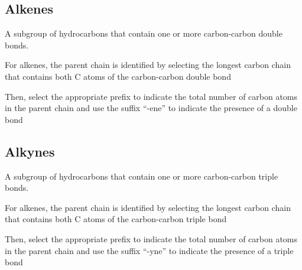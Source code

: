\subsection{Alkenes}
A subgroup of hydrocarbons that contain one or more carbon-carbon double bonds.
\begin{enum}
    \item For alkenes, the parent chain is identified by selecting the longest carbon chain that
        contains both C atoms of the carbon-carbon double bond
    \item Then, select the appropriate prefix to indicate the total number of carbon atoms in the
        parent chain and use the suffix ``-ene'' to indicate the presence of a double bond
\end{enum}

\subsection{Alkynes}
A subgroup of hydrocarbons that contain one or more carbon-carbon triple bonds.
\begin{enum}
    \item For alkenes, the parent chain is identified by selecting the longest carbon chain that
        contains both C atoms of the carbon-carbon triple bond
    \item Then, select the appropriate prefix to indicate the total number of carbon atoms in the
        parent chain and use the suffix ``-yne'' to indicate the presence of a triple bond
\end{enum}
